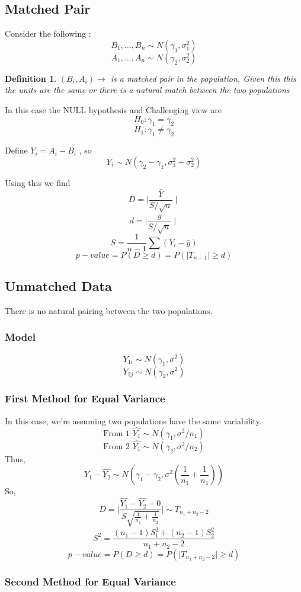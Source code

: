 \documentclass{article}
\newtheorem{definition}[theorem]{Definition}
\begin{document}
\subsection*{Matched Pair}
Consider the following : 
$$ B_1, \ldots, B_n \sim N(\gamma_1, \sigma_1^2) $$
$$ A_1, \ldots, A_n \sim N(\gamma_2, \sigma_2^2) $$
\begin{definition}
\((B_i, A_i) \rightarrow \) is a matched pair in the population, Given this this the units are the same or there is a natural match between the two populations
\end{definition}

In this case the NULL hypothesis and Challenging view are
$$ H_0 : \gamma _1 = \gamma_2 $$
$$ H_1 : \gamma_1 \neq \gamma_2 $$

Define \(Y_i = A_i - B_i \) , so 
$$ Y_i \sim N(\gamma_2 - \gamma_1, \sigma_1^2 + \sigma_2^2)$$

Using this we find 
$$ D = \mid \frac{\bar{Y}}{S / \sqrt{n}} \mid $$
$$ d = \mid \frac{\bar{y}}{S / \sqrt{n}} \mid $$
$$ S = \frac{1}{n-1} \sum(Y_i - \bar{y}) $$
$$ p-value = P(D \geq d) = P(\mid T_{n-1} \mid \geq d) $$

\subsection*{Unmatched Data}
There is no natural pairing between the two populations. 
\subsubsection*{Model}
$$ Y_{1i} \sim N(\gamma_1, \sigma^2) $$
$$ Y_{2j} \sim N(\gamma_2, \sigma^2) $$

\subsubsection*{First Method for Equal Variance}
In this case, we're assuming two populations have the same variability. 
$$ \text{From 1 } \hat{Y_1} \sim N (\gamma_1, \sigma^2 / n_1) $$
$$ \text{From 2 } \hat{Y_1} \sim N (\gamma_2, \sigma^2 / n_2) $$
Thus, 
$$  \hat{Y_1} - \hat{Y_2} \sim N (\gamma_1 - \gamma_2, \sigma^2 (\frac{1}{n_1} + \frac{1}{n_1})) $$
So, 
$$ D = \mid \frac{\hat{Y_1} - \hat{Y_2} - 0}{S \sqrt{\frac{1}{n_1} + \frac{1}{n_2}}}\mid \sim T_{n_1 + n_2 - 2}$$
$$ S^2 = \frac{(n_1 -1) S_1^2 + (n_2 - 1) S_2^2}{n_1 + n_2 - 2} $$
$$p-value = P(D \geq d) = P(\mid T_{n_1 + n_2 - 2}  \mid \geq d)$$

\subsubsection*{Second Method for Equal Variance}
\end{document}
